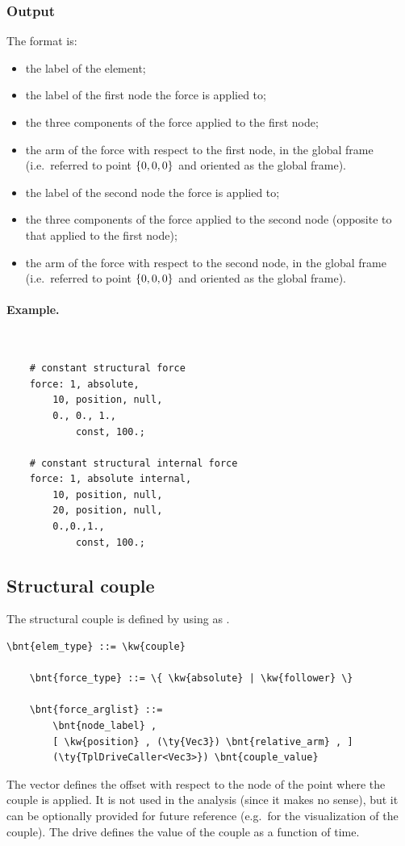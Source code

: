 \subsubsection{Output}
The format is:
\begin{itemize}
    \item the label of the element;
    \item the label of the first node the force is applied to;
    \item the three components of the force applied to the first node;
    \item the arm of the force with respect to the first node,
	  in the global frame (i.e.\ referred to point $ \left\{ 0,0,0 \right\} $
	  and oriented as the global frame).
    \item the label of the second node the force is applied to;
    \item the three components of the force applied to the second node
	  (opposite to that applied to the first node);
    \item the arm of the force with respect to the second node,
	  in the global frame (i.e.\ referred to point $ \left\{ 0,0,0 \right\} $
	  and oriented as the global frame).
\end{itemize}

\paragraph{Example.} \
\begin{verbatim}
    # constant structural force
    force: 1, absolute,
        10, position, null,
        0., 0., 1.,
            const, 100.;

    # constant structural internal force
    force: 1, absolute internal,
        10, position, null,
        20, position, null,
        0.,0.,1.,
            const, 100.;
\end{verbatim}


\subsection{Structural couple}
\label{sec:EL:FORCE:STRUCTURAL:COUPLE}
The structural couple is defined by using  as .
\begin{Verbatim}[commandchars=\\\{\}]
    \bnt{elem_type} ::= \kw{couple}

    \bnt{force_type} ::= \{ \kw{absolute} | \kw{follower} \} 

    \bnt{force_arglist} ::=
        \bnt{node_label} ,
        [ \kw{position} , (\ty{Vec3}) \bnt{relative_arm} , ]
        (\ty{TplDriveCaller<Vec3>}) \bnt{couple_value}
\end{Verbatim}
The vector  defines the offset with respect
to the node of the point where the couple is applied.
It is not used in the analysis (since it makes no sense),
but it can be optionally provided for future reference
(e.g.\ for the visualization of the couple).
The drive  defines the value of the couple
as a function of time.

